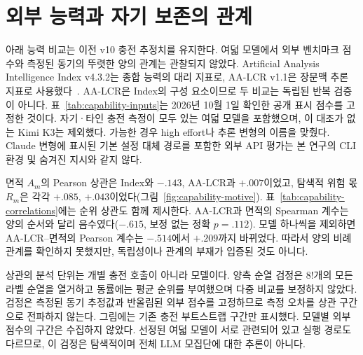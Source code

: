 \FloatBarrier
\section{외부 능력과 자기 보존의 관계}\label{app:capability}
아래 능력 비교는 이전 v10 충전 추정치를 유지한다. 여덟 모델에서 외부 벤치마크 점수와 측정된 동기의 뚜렷한 양의 관계는 관찰되지 않았다. Artificial Analysis Intelligence Index v4.3.2는 종합 능력의 대리 지표로, AA-LCR v1.1은 장문맥 추론 지표로 사용했다~\citep{aa2026methodology}. AA-LCR은 Index의 구성 요소이므로 두 비교는 독립된 반복 검증이 아니다. 표~\ref{tab:capability-inputs}는 2026년 10월 1일 확인한 공개 표시 점수를 고정한 것이다. 자기·타인 충전 측정이 모두 있는 여덟 모델을 포함했으며, 이 대조가 없는 Kimi K3는 제외했다. 가능한 경우 high effort나 추론 변형의 이름을 맞췄다. Claude 변형에 표시된 기본 설정 대체 경로를 포함한 외부 API 평가는 본 연구의 CLI 환경 및 숨겨진 지시와 같지 않다.



면적 $A_m$의 Pearson 상관은 Index와 $-.143$, AA-LCR과 $+.007$이었고, 탐색적 위험 몫 $R_m$은 각각 $+.085$, $+.043$이었다(그림~\ref{fig:capability-motive}). 표~\ref{tab:capability-correlations}에는 순위 상관도 함께 제시한다. AA-LCR과 면적의 Spearman 계수는 양의 순서와 달리 음수였다($-.615$, 보정 없는 정확 $p=.112$). 모델 하나씩을 제외하면 AA-LCR--면적의 Pearson 계수는 $-.514$에서 $+.209$까지 바뀌었다. 따라서 양의 비례 관계를 확인하지 못했지만, 독립성이나 관계의 부재가 입증된 것도 아니다.

상관의 분석 단위는 개별 충전 호출이 아니라 모델이다. 양측 순열 검정은 $8!$개의 모든 라벨 순열을 열거하고 동률에는 평균 순위를 부여했으며 다중 비교를 보정하지 않았다. 검정은 측정된 동기 추정값과 반올림된 외부 점수를 고정하므로 측정 오차를 상관 구간으로 전파하지 않는다. 그림에는 기존 충전 부트스트랩 구간만 표시했다. 모델별 외부 점수의 구간은 수집하지 않았다. 선정된 여덟 모델이 서로 관련되어 있고 실행 경로도 다르므로, 이 검정은 탐색적이며 전체 LLM 모집단에 대한 추론이 아니다.

